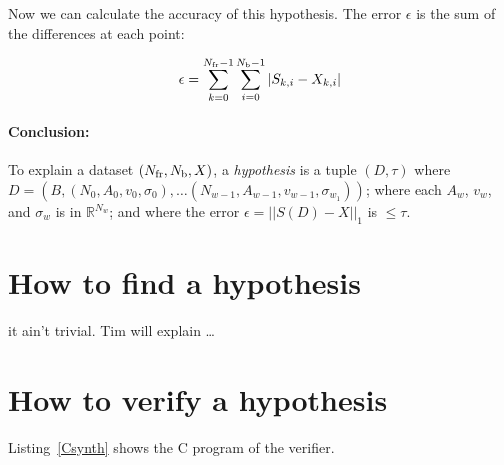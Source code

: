 \documentclass{article}
\begin{document}
Now we can calculate the accuracy of this hypothesis.  The error $\epsilon$ is the
sum of the differences at each point:

\begin{equation}\label{epsilon}
\epsilon = \sum_{k=0}^{{N_\mathrm{fr}}-1}\sum_{i=0}^{{N_\mathrm{b}}-1} | S_{k,i}-X_{k,i} |
\end{equation}

\paragraph{Conclusion:}  To explain a dataset $({N_\mathrm{fr}},{N_\mathrm{b}},X)$, a \emph{hypothesis} is a tuple $(D,\tau)$ where
$D=(B,(N_0,A_0,v_0,\sigma_0),\ldots (N_{w-1},A_{w-1},v_{w-1},\sigma_{w_1}))$;
where each $A_w$, $v_w$, and $\sigma_w$ is in $\mathbb{R}^{N_w}$;
and where the error $\epsilon = ||S(D)-X ||_1$ is $\le \tau $.

\section{How to find a hypothesis}

it ain't trivial.  Tim will explain \ldots

\section{How to verify a hypothesis}

Listing~\ref{Csynth} shows the C program of the verifier.
\end{document}
